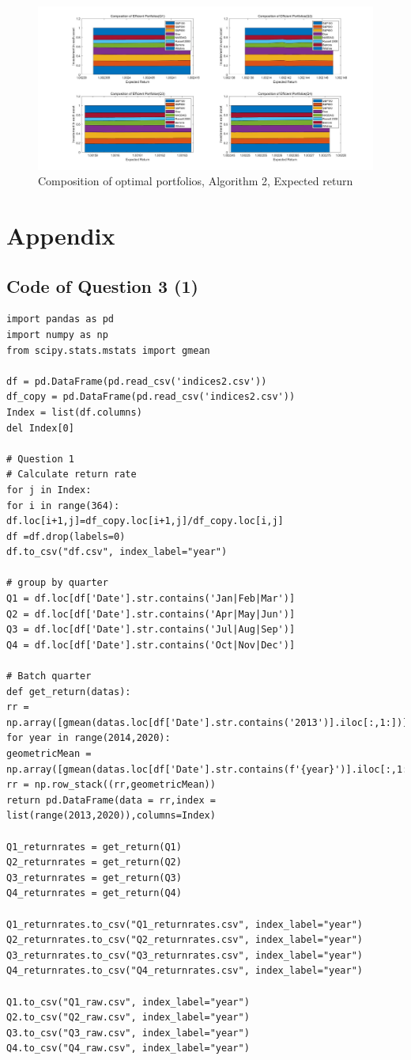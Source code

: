 \documentclass[11pt,a4paper]{article}
\begin{document}
\begin{figure}[H] 
	\centering 
	\includegraphics[width=1\textwidth]{54.jpg} %
	\caption{Composition of optimal portfolios, Algorithm 2, Expected return} 
	\label{Fig.main7} 
\end{figure}

\section*{Appendix}
\subsection*{Code of Question 3 (1)}
\begin{lstlisting}
import pandas as pd
import numpy as np
from scipy.stats.mstats import gmean

df = pd.DataFrame(pd.read_csv('indices2.csv'))
df_copy = pd.DataFrame(pd.read_csv('indices2.csv'))
Index = list(df.columns)
del Index[0]

# Question 1
# Calculate return rate
for j in Index:
for i in range(364):
df.loc[i+1,j]=df_copy.loc[i+1,j]/df_copy.loc[i,j]
df =df.drop(labels=0)
df.to_csv("df.csv", index_label="year")

# group by quarter
Q1 = df.loc[df['Date'].str.contains('Jan|Feb|Mar')]
Q2 = df.loc[df['Date'].str.contains('Apr|May|Jun')]
Q3 = df.loc[df['Date'].str.contains('Jul|Aug|Sep')]
Q4 = df.loc[df['Date'].str.contains('Oct|Nov|Dec')]

# Batch quarter
def get_return(datas):
rr = np.array([gmean(datas.loc[df['Date'].str.contains('2013')].iloc[:,1:])])
for year in range(2014,2020):
geometricMean = np.array([gmean(datas.loc[df['Date'].str.contains(f'{year}')].iloc[:,1:])])
rr = np.row_stack((rr,geometricMean))
return pd.DataFrame(data = rr,index = list(range(2013,2020)),columns=Index)

Q1_returnrates = get_return(Q1)
Q2_returnrates = get_return(Q2)
Q3_returnrates = get_return(Q3)
Q4_returnrates = get_return(Q4)

Q1_returnrates.to_csv("Q1_returnrates.csv", index_label="year")
Q2_returnrates.to_csv("Q2_returnrates.csv", index_label="year")
Q3_returnrates.to_csv("Q3_returnrates.csv", index_label="year")
Q4_returnrates.to_csv("Q4_returnrates.csv", index_label="year")

Q1.to_csv("Q1_raw.csv", index_label="year")
Q2.to_csv("Q2_raw.csv", index_label="year")
Q3.to_csv("Q3_raw.csv", index_label="year")
Q4.to_csv("Q4_raw.csv", index_label="year")
\end{lstlisting}
\end{document}
